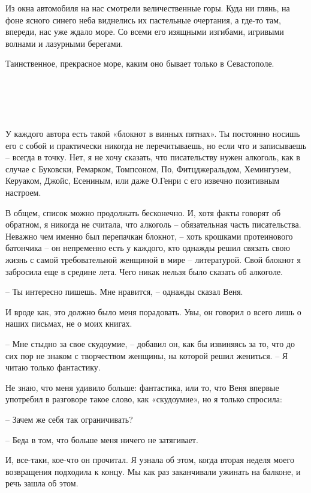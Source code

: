 \documentclass[
]{book}
\begin{document}
Из окна автомобиля на нас смотрели величественные горы. Куда ни глянь, на фоне ясного синего неба виднелись их пастельные очертания, а где-то там, впереди, нас уже ждало море. Со всеми его изящными изгибами, игривыми волнами и лазурными берегами.

Таинственное, прекрасное море, каким оно бывает только в Севастополе.

\hypertarget{chapter-48}{%
\chapter{~}\label{chapter-48}}

У каждого автора есть такой «блокнот в винных пятнах». Ты постоянно носишь его с собой и практически никогда не перечитываешь, но если что и записываешь -- всегда в точку. Нет, я не хочу сказать, что писательству нужен алкоголь, как в случае с Буковски, Ремарком, Томпсоном, По, Фитцджеральдом, Хемингуэем, Керуаком, Джойс, Есениным, или даже О.Генри с его извечно позитивным настроем.

В общем, список можно продолжать бесконечно. И, хотя факты говорят об обратном, я никогда не считала, что алкоголь -- обязательная часть писательства. Неважно чем именно был перепачкан блокнот, -- хоть крошками протеинового батончика -- он непременно есть у каждого, кто однажды решил связать свою жизнь с самой требовательной женщиной в мире -- литературой. Свой блокнот я забросила еще в средине лета. Чего никак нельзя было сказать об алкоголе.

-- Ты интересно пишешь. Мне нравится, -- однажды сказал Веня.

И вроде как, это должно было меня порадовать. Увы, он говорил о всего лишь о наших письмах, не о моих книгах.

-- Мне стыдно за свое скудоумие, -- добавил он, как бы извиняясь за то, что до сих пор не знаком с творчеством женщины, на которой решил жениться. -- Я читаю только фантастику.

Не знаю, что меня удивило больше: фантастика, или то, что Веня впервые употребил в разговоре такое слово, как «скудоумие», но я только спросила:

-- Зачем же себя так ограничивать?

-- Беда в том, что больше меня ничего не затягивает.

И, все-таки, кое-что он прочитал. Я узнала об этом, когда вторая неделя моего возвращения подходила к концу. Мы как раз заканчивали ужинать на балконе, и речь зашла об этом.
\end{document}
